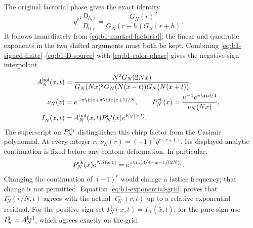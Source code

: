 The original factorial phase gives the exact identity
\begin{equation}\label{eq:b1-color-phase}
 q^{h^2}\frac{D_{h,r}}{D_{0,r}}
 =\frac{G_N(r)^2}{G_N(r-h)G_N(r+h)}.
\end{equation}
It follows immediately from \eqref{eq:b1-marked-factorial}; the linear
and quadratic exponents in the two shifted arguments must both be kept.
Combining \eqref{eq:b1-signed-finite}--\eqref{eq:b1-D-source} with
\eqref{eq:b1-color-phase} gives the negative-sign interpolant
\begin{align}
 A_N^{\rm hol}(x,t)
 &=\frac{N^2G_N(2Nx)}
 {G_N(Nx)^2G_N(N(x-t))G_N(N(x+t))},
 \notag\\
 \nu_N(z)&=e^{-\pi\ii z+\pi\ii z(z+1)/N},
 \qquad P_N^{\rm ch}(x)=\frac{\kappa^{-1}e^{\pi\ii d/4}}{\nu_N(Nx)},
 \notag\\
 I_N^-(x,t)&=A_N^{\rm hol}(x,t)P_N^{\rm ch}(x)e^{E_N(x,t)}.
 \label{eq:b1-signed-interpolant}
\end{align}
The superscript on $P_N^{\rm ch}$ distinguishes this chirp factor from
the Casimir polynomial. At every integer $r$,
$\nu_N(r)=(-1)^rq^{r(r+1)}$. Its displayed analytic continuation is
fixed before any contour deformation. In particular,
\begin{equation}\label{eq:b1-chirp-cancellation}
 P_N^{\rm ch}(x)e^{NS(x,0)}
   =e^{\pi\ii(3/4-x-1/(2N))}.
\end{equation}
Changing the continuation of $(-1)^r$ would change a lattice frequency;
that change is not permitted. Equation
\eqref{eq:b1-exponential-grid} proves that
$I_N^-(r/N,t)$ agrees with the actual $\ell_N^-(r,t)$ up to a
relative exponential residual. For the positive sign set
$I_N^+(x,t)=\overline{I_N^-(\bar x,\bar t)}$; for the pure sign use
$I_N^0=A_N^{\rm hol}$, which agrees exactly on the grid.


